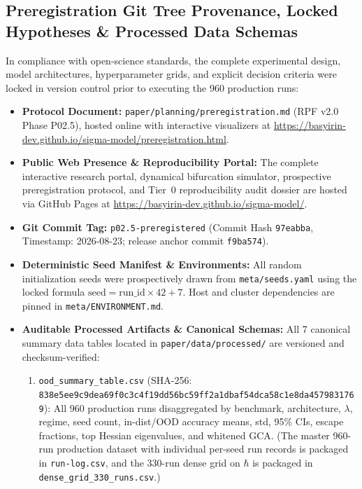 \documentclass{article}
\theoremstyle{plain}
\theoremstyle{definition}
\begin{document}
\subsection{Preregistration Git Tree Provenance, Locked Hypotheses \& Processed Data Schemas}
\label{sec:app_preregistration_provenance}
In compliance with open-science standards, the complete experimental design, model architectures, hyperparameter grids, and explicit decision criteria were locked in version control prior to executing the 960 production runs:
\begin{itemize}[leftmargin=*,noitemsep]
    \item \textbf{Protocol Document:} \texttt{paper/planning/preregistration.md} (RPF v2.0 Phase P02.5), hosted online with interactive visualizers at \url{https://basyirin-dev.github.io/sigma-model/preregistration.html}.
    \item \textbf{Public Web Presence \& Reproducibility Portal:} The complete interactive research portal, dynamical bifurcation simulator, prospective preregistration protocol, and Tier~0 reproducibility audit dossier are hosted via GitHub Pages at \url{https://basyirin-dev.github.io/sigma-model/}.
    \item \textbf{Git Commit Tag:} \texttt{p02.5-preregistered} (Commit Hash \texttt{97eabba}, Timestamp: 2026-08-23; release anchor commit \texttt{f9ba574}).
    \item \textbf{Deterministic Seed Manifest \& Environments:} All random initialization seeds were prospectively drawn from \texttt{meta/seeds.yaml} using the locked formula $\text{seed} = \text{run\_id} \times 42 + 7$. Host and cluster dependencies are pinned in \texttt{meta/ENVIRONMENT.md}.
    \item \textbf{Auditable Processed Artifacts \& Canonical Schemas:} All 7 canonical summary data tables located in \texttt{paper/data/processed/} are versioned and checksum-verified:
    \begin{enumerate}[label=(\alph*),noitemsep]
        \item \texttt{ood\_summary\_table.csv} (SHA-256: \texttt{838e5ee9c9dea69f0c3c4f19dd56bc59ff2a1dbaf54dca58c1e8da4579831769}): All 960 production runs disaggregated by benchmark, architecture, $\lambda$, regime, seed count, in-dist/OOD accuracy means, std, 95\% CIs, escape fractions, top Hessian eigenvalues, and whitened GCA. (The master 960-run production dataset with individual per-seed run records is packaged in \texttt{run-log.csv}, and the 330-run dense grid on $\hbar$ is packaged in \texttt{dense\_grid\_330\_runs.csv}.)

\end{enumerate}
\end{itemize}
\end{document}
